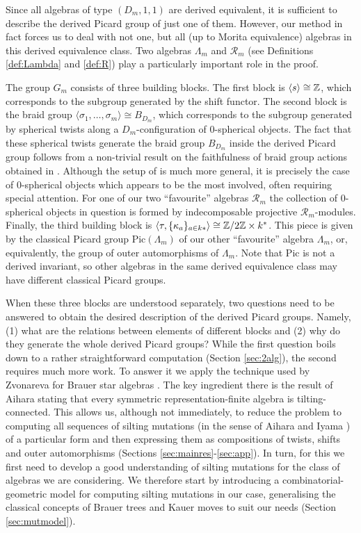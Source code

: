 \documentclass[12pt]{amsart}
\theoremstyle{plain}
\theoremstyle{remark}
\theoremstyle{definition}
\newcommand{\Pic}{{\mathrm{Pic}}}
\begin{document}
Since all algebras of type $(D_m,1,1)$ are derived equivalent, it is sufficient to describe the derived Picard group of just one of them. However, our method in fact forces us to deal with not one, but all (up to Morita equivalence) algebras in this derived equivalence class. Two algebras $\Lambda_m$ and $\mathcal{R}_m$ (see Definitions \ref{def:Lambda} and \ref{def:R}) play a particularly important role in the proof. 

The group $G_m$ consists of three building blocks. The first block is $\langle s \rangle \cong \mathbb Z$, which corresponds to the subgroup generated by the shift functor. The second block is the braid group $\langle \sigma_1, \dots, \sigma_m \rangle \cong B_{D_m}$, which corresponds to the subgroup generated by spherical twists along a $D_m$-configuration of $0$-spherical objects. The fact that these spherical twists generate the braid group $B_{D_m}$ inside the derived Picard group follows from a non-trivial result on the faithfulness of braid group actions obtained in \cite{NV}. Although the setup of \cite{NV} is much more general, it is precisely the case of 0-spherical objects which appears to be the most involved, often requiring special attention. For one of our two ``favourite'' algebras $\mathcal{R}_m$ the collection of $0$-spherical objects in question is formed by indecomposable projective $\mathcal{R}_m$-modules. Finally, the third building block is $\langle \tau, \{\kappa_a\}_{a \in k*} \rangle \cong \mathbb Z/2\mathbb Z \times k^*$. This piece is given by the classical Picard group $\Pic(\Lambda_m)$ of our other ``favourite'' algebra $\Lambda_m$, or, equivalently, the group of outer automorphisms of $\Lambda_m$. Note that $\Pic$ is not a derived invariant, so other algebras in the same derived equivalence class may have different classical Picard groups. 


When these three blocks are understood separately, two questions need to be answered to obtain the desired description of the derived Picard groups. Namely, (1) what are the relations between elements of different blocks and (2) why do they generate the whole derived Picard groups? While the first question boils down to a rather straightforward computation (Section \ref{sec:2alg}), the second requires much more work. To answer it we apply the technique used by Zvonareva for Brauer star algebras \cite{Alexandra}. The key ingredient there is the result of Aihara \cite{Aih} stating that every symmetric representation-finite algebra is tilting-connected. This allows us, although not immediately, to reduce the problem to computing all sequences of silting mutations (in the sense of Aihara and Iyama \cite{AI}) of a particular form and then expressing them as compositions of twists, shifts and outer automorphisms (Sections \ref{sec:mainres}-\ref{sec:app}). In turn, for this we first need to develop a good understanding of silting mutations for the class of algebras we are considering. We therefore start by introducing a combinatorial-geometric model for computing silting mutations in our case, generalising the classical concepts of Brauer trees and Kauer moves to suit our needs (Section \ref{sec:mutmodel}).
\end{document}
